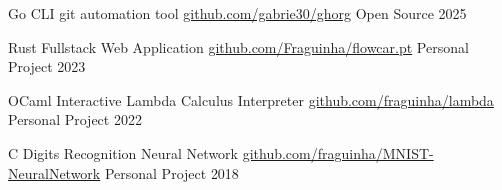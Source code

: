 




\begin{cvhonors}

\cvhonor
  {Go CLI git automation tool}
  {\href{https://github.com/gabrie30/ghorg}{github.com/gabrie30/ghorg}}
  {Open Source}
  {2025}

\cvhonor
  {Rust Fullstack Web Application}
  {\href{https://github.com/Fraguinha/flowcar.pt}{github.com/Fraguinha/flowcar.pt}}
  {Personal Project}
  {2023}

\cvhonor
  {OCaml Interactive Lambda Calculus Interpreter}
  {\href{https://github.com/fraguinha/lambda}{github.com/fraguinha/lambda}}
  {Personal Project}
  {2022}

\cvhonor
  {C Digits Recognition Neural Network}
  {\href{https://github.com/fraguinha/MNIST-NeuralNetwork}{github.com/fraguinha/MNIST-NeuralNetwork}}
  {Personal Project}
  {2018}


\end{cvhonors}










